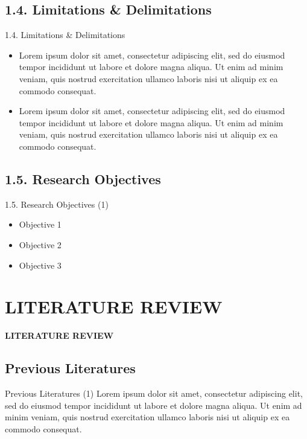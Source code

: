 \documentclass[11pt]{beamer}%
\begin{document}
\subsection{1.4. Limitations \& Delimitations}
\begin{frame}{1.4. Limitations \& Delimitations}
	\begin{itemize}
		\item Lorem ipsum dolor sit amet, consectetur adipiscing elit, sed do eiusmod tempor incididunt ut labore et dolore magna aliqua. Ut enim ad minim veniam, quis nostrud exercitation ullamco laboris nisi ut aliquip ex ea commodo consequat.
		\item Lorem ipsum dolor sit amet, consectetur adipiscing elit, sed do eiusmod tempor incididunt ut labore et dolore magna aliqua. Ut enim ad minim veniam, quis nostrud exercitation ullamco laboris nisi ut aliquip ex ea commodo consequat.
	\end{itemize}
\end{frame}

\subsection{1.5. Research Objectives}
\begin{frame}{1.5. Research Objectives (1)}
	\begin{itemize}
		\item Objective 1
		\item Objective 2
		\item Objective 3
	\end{itemize}
\end{frame}


\section{LITERATURE REVIEW}
\begin{frame}{}
	\begin{center} 
		\textbf{\huge LITERATURE REVIEW}\vspace{-30pt} 
	\end{center}
\end{frame}

\subsection{Previous Literatures}
\begin{frame}{Previous Literatures (1)}
	Lorem ipsum dolor sit amet, consectetur adipiscing elit, sed do eiusmod tempor incididunt ut labore et dolore magna aliqua. Ut enim ad minim veniam, quis nostrud exercitation ullamco laboris nisi ut aliquip ex ea commodo consequat.
\end{frame}
\end{document}
